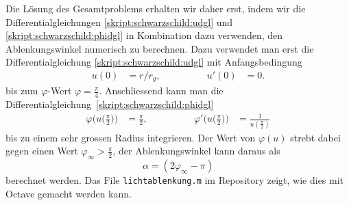 Die Lösung des Gesamtproblems erhalten wir daher erst, indem wir
die Differentialgleichungen
\eqref{skript:schwarzschild:udgl}
und
\eqref{skript:schwarzschild:phidgl}
in Kombination dazu verwenden, den Ablenkungswinkel
numerisch zu berechnen.
Dazu verwendet man erst die Differentialgleichung
\eqref{skript:schwarzschild:udgl}
mit Anfangsbedingung
\begin{equation*}
\begin{aligned}
u(0)&=r/r_g,
\qquad&\qquad
u'(0)&=0.
\end{aligned}
\end{equation*}
bis zum $\varphi$-Wert $\varphi=\frac{\pi}4$.
Anschliessend kann man die
Differentialgleichung~\eqref{skript:schwarzschild:phidgl}
\begin{equation*}
\begin{aligned}
\varphi\biggl(u\biggl(\frac{\pi}2\biggr)\biggr)&=\frac{\pi}2,
\qquad&\qquad
\varphi'\biggl(u\biggl(\frac{\pi}2\biggr)\biggr)&=\frac1{u(\frac{\pi}2)}
\end{aligned}
\end{equation*}
bis zu einem sehr grossen Radius integrieren. 
Der Wert von $\varphi(u)$ strebt dabei gegen einen Wert
$\varphi_\infty>\frac{\pi}2$, der Ablenkungswinkel kann daraus als
\[
\alpha
=
(2\varphi_\infty - \pi)
\]
berechnet werden.
Das File \texttt{lichtablenkung.m} im Repository zeigt, wie dies mit
Octave gemacht werden kann.


